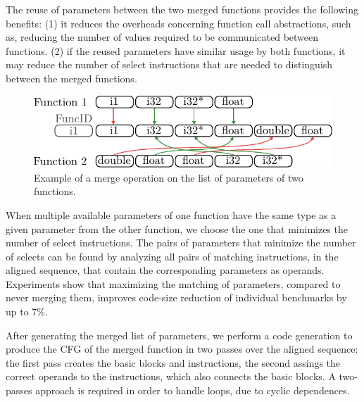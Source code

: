 The reuse of parameters between the two merged functions provides the following
benefits:
(1) it reduces the overheads concerning function call abstractions, such as,
reducing the number of values required to be communicated between functions.
(2) if the reused parameters have similar usage by both functions, it may reduce
the number of select instructions that are needed to distinguish between the
merged functions.

\begin{figure}[h]
  \centering
  \includegraphics[width=0.9\linewidth]{figs/merged-params.pdf}
  \caption{Example of a merge operation on the list of parameters of two functions.}
  \label{fig:merged-params}
\end{figure}


When multiple available parameters of one function have the same type as a given
parameter from the other function, we choose the one that minimizes the number
of select instructions.
The pairs of parameters that minimize the number of selects can be found by
analyzing all pairs of matching instructions, in the aligned sequence, that
contain the corresponding parameters as operands.
Experiments show that maximizing the matching of parameters, compared to never
merging them, improves code-size reduction of individual benchmarks by up to 7\%.



After generating the merged list of parameters, we perform a code generation
to produce the CFG of the merged function in two passes over the aligned
sequence: the first pass creates the basic blocks and instructions,
the second assings the correct operands to the instructions, which also connects
the basic blocks.
A two-passes approach is required in order to handle loops, due to cyclic
dependences.

